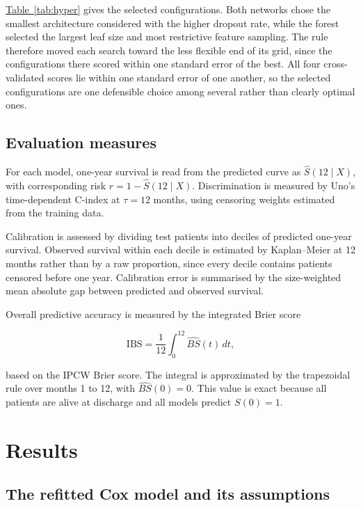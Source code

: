 \documentclass[11pt,a4paper]{article}
\newcommand{\tabref}[1]{\hyperref[#1]{Table~\ref*{#1}}}
\begin{document}
\tabref{tab:hyper} gives the selected configurations. Both networks chose the smallest architecture considered with the higher dropout rate, while the forest selected the largest leaf size and most restrictive feature sampling. The rule therefore moved each search toward the less flexible end of its grid, since the configurations there scored within one standard error of the best. All four cross-validated scores lie within one standard error of one another, so the selected configurations are one defensible choice among several rather than clearly optimal ones.

\subsection{Evaluation measures}

For each model, one-year survival is read from the predicted curve as $\hat S(12 \mid X)$, with corresponding risk
$r = 1 - \hat S(12 \mid X)$. Discrimination is measured by Uno's time-dependent C-index at
$\tau = 12$ months, using censoring weights estimated from the training data.

Calibration is assessed by dividing test patients into deciles of predicted one-year survival. Observed survival within each decile is estimated by Kaplan--Meier at 12 months rather than by a raw proportion, since every decile contains patients censored before one year. Calibration error is summarised by the size-weighted mean absolute gap between predicted and observed survival.

Overall predictive accuracy is measured by the integrated Brier score

$$
  \mathrm{IBS} = \frac{1}{12}\int_{0}^{12} \widehat{BS}(t)\,dt,
$$

based on the IPCW Brier score. The integral is approximated by the trapezoidal rule over months 1 to 12, with $\widehat{BS}(0) = 0$. This value is exact because all patients are alive at discharge and all models predict $S(0) = 1$.



\section{Results}

\subsection{The refitted Cox model and its assumptions}
\end{document}
